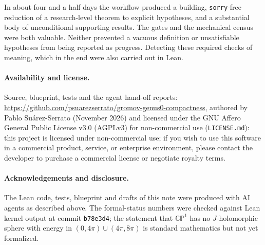 \documentclass[11pt]{article}
\renewcommand{\_}{\origus\allowbreak}
\newcommand{\CP}{\mathbb{CP}^1}
\newcommand{\code}[1]{\texttt{#1}}
\begin{document}
In about four and a half days the workflow produced a building, \code{sorry}-free reduction of a
research-level theorem to explicit hypotheses, and a substantial body of unconditional supporting
results. The gates and the mechanical census were both valuable. Neither prevented a vacuous
definition or unsatisfiable hypotheses from being reported as progress. Detecting these required
checks of meaning, which in the end were also carried out in Lean.

\paragraph{Availability and license.} Source, blueprint, tests and the agent hand-off reports:
\url{https://github.com/psuarezserrato/gromov-genus0-compactness}, authored by Pablo Su\'arez-Serrato
(November 2026) and licensed under the GNU Affero General Public License v3.0 (AGPLv3) for
non-commercial use (\code{LICENSE.md}): this project is licensed under non-commercial use; if you
wish to use this software in a commercial product, service, or enterprise environment, please
contact the developer to purchase a commercial license or negotiate royalty terms.

\paragraph{Acknowledgements and disclosure.} The Lean code, tests, blueprint and drafts of this
note were produced with AI agents as described above. The formal-status numbers were checked
against Lean kernel output at commit \code{b78e3d4}; the statement that $\CP$ has no
$J$-holomorphic sphere with energy in $(0,4\pi)\cup(4\pi,8\pi)$ is standard mathematics but not yet
formalized.
\end{document}
